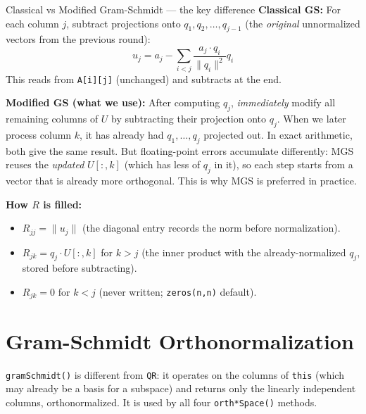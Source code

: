 \documentclass[12pt, a4paper]{article}
\newcommand{\code}[1]{\texttt{\small#1}}
\newcommand{\fn}[1]{\texttt{\small\color{funcgreen}#1}}
\begin{document}
\begin{notebox}{Classical vs Modified Gram-Schmidt --- the key difference}
\textbf{Classical GS:}
For each column $j$, subtract projections onto $q_1, q_2, \ldots, q_{j-1}$
(the \emph{original} unnormalized vectors from the previous round):
\[
u_j = a_j - \sum_{i<j} \frac{a_j \cdot q_i}{\|q_i\|^2} q_i
\]
This reads from \code{A[i][j]} (unchanged) and subtracts at the end.

\textbf{Modified GS (what we use):}
After computing $q_j$, \emph{immediately} modify all remaining columns of $U$
by subtracting their projection onto $q_j$.  When we later process column $k$,
it has already had $q_1, \ldots, q_{j}$ projected out.  In exact arithmetic,
both give the same result.  But floating-point errors accumulate differently:
MGS reuses the \emph{updated} $U[:, k]$ (which has less of $q_j$ in it), so
each step starts from a vector that is already more orthogonal.  This is why
MGS is preferred in practice.
\end{notebox}

\noindent
\textbf{How $R$ is filled:}
\begin{itemize}[noitemsep]
  \item $R_{jj} = \|u_j\|$ (the diagonal entry records the norm before normalization).
  \item $R_{jk} = q_j \cdot U[:, k]$ for $k > j$ (the inner product with the
        already-normalized $q_j$, stored before subtracting).
  \item $R_{jk} = 0$ for $k < j$ (never written; \code{zeros(n,n)} default).
\end{itemize}

\section{Gram-Schmidt Orthonormalization}

\fn{gramSchmidt()} is different from \fn{QR}: it operates on the columns of
\code{*this} (which may already be a basis for a subspace) and returns only
the linearly independent columns, orthonormalized.  It is used by all four
\fn{orth*Space()} methods.
\end{document}
